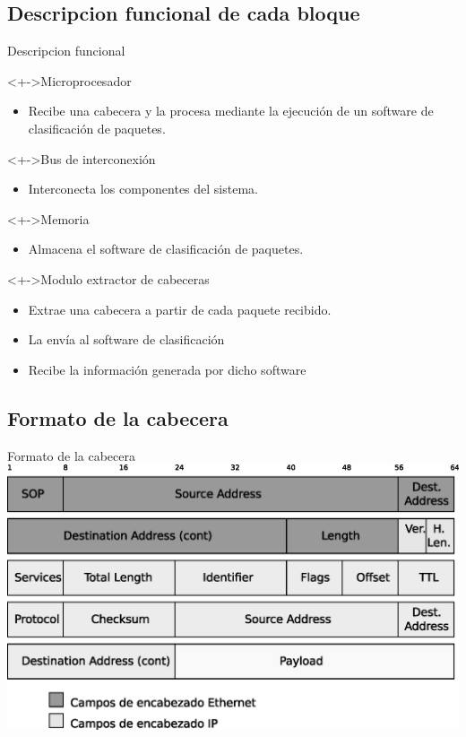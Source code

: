 \documentclass[xcolor=dvipsnames]{beamer}
\begin{document}
\subsection{Descripcion funcional de cada bloque}
\begin{frame}{Descripcion funcional}
\begin{block}<+->{Microprocesador}   
    \begin{itemize}
      \scriptsize
     	\item Recibe una cabecera y la procesa mediante la ejecución de un software de clasificación de paquetes.
    \end{itemize}
  \end{block}
  \begin{block}<+->{Bus de interconexión}   
    \begin{itemize}
      \scriptsize
     	\item Interconecta los componentes del sistema. 
    \end{itemize}
  \end{block}
\begin{block}<+->{Memoria}   
    \begin{itemize}
      \scriptsize
     	\item Almacena el software de clasificación de paquetes.
    \end{itemize}
  \end{block}
  \begin{block}<+->{Modulo extractor de cabeceras}   
    \begin{itemize}
      \scriptsize
     	\item Extrae una cabecera a partir de cada paquete recibido.
	\item La envía al software de clasificación
	\item Recibe la información generada por dicho software
    \end{itemize}
  \end{block}
\end{frame}

\subsection{Formato de la cabecera}
\begin{frame}{Formato de la cabecera}
 \center 
\includegraphics[scale=0.55]{figures/cabecera.eps}
\end{frame}
\end{document}
